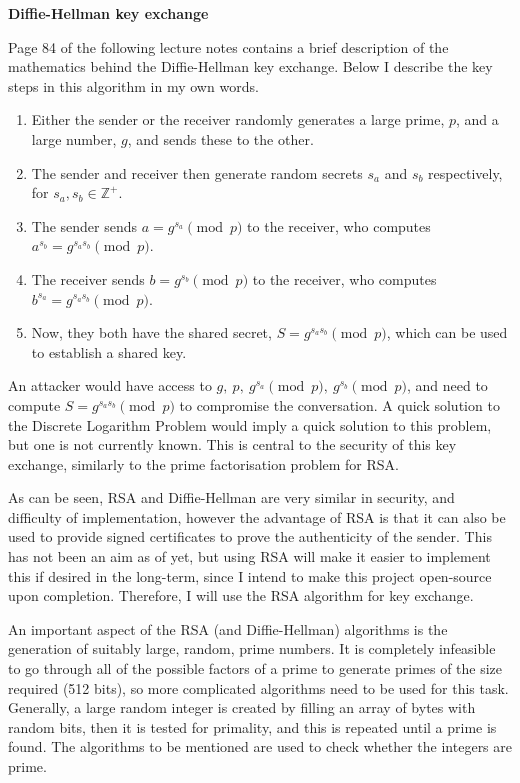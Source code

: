 \documentclass[../main.tex]{subfiles}
\begin{document}
\bigskip
\textbf{Diffie-Hellman key exchange}

Page 84 of the following lecture notes \cite{OxCompSecNotes} contains a brief description of the mathematics behind the Diffie-Hellman key exchange. Below I describe the key steps in this algorithm in my own words.
\begin{enumerate}
    \item Either the sender or the receiver randomly generates a large prime, $p$, and a large number, $g$, and sends these to the other. 
    \item The sender and receiver then generate random secrets $s_a$ and $s_b$ respectively, for $s_a,s_b \in \mathbb{Z}^+$. 
    \item The sender sends $a = g^{s_a}\pmod p$ to the receiver, who computes $a^{s_b} = g^{s_as_b}\pmod p$. 
    \item The receiver sends $b = g^{s_b}\pmod p$ to the receiver, who computes $b^{s_a} = g^{s_as_b}\pmod p$. 
    \item Now, they both have the shared secret, $S = g^{s_as_b}\pmod p$, which can be used to establish a shared key.
\end{enumerate}

An attacker would have access to $g,\ p,\ g^{s_a}\pmod p,\ g^{s_b}\pmod p$, and need to compute $S = g^{s_as_b}\pmod p$ to compromise the conversation. A quick solution to the Discrete Logarithm Problem would imply a quick solution to this problem, but one is not currently known. This is central to the security of this key exchange, similarly to the prime factorisation problem for RSA.

As can be seen, RSA and Diffie-Hellman are very similar in security, and difficulty of implementation, however the advantage of RSA is that it can also be used to provide signed certificates to prove the authenticity of the sender. This has not been an aim as of yet, but using RSA will make it easier to implement this if desired in the long-term, since I intend to make this project open-source upon completion. Therefore, I will use the RSA algorithm for key exchange.

An important aspect of the RSA (and Diffie-Hellman) algorithms is the generation of suitably large, random, prime numbers. It is completely infeasible to go through all of the possible factors of a prime to generate primes of the size required (512 bits), so more complicated algorithms need to be used for this task. Generally, a large random integer is created by filling an array of bytes with random bits, then it is tested for primality, and this is repeated until a prime is found. The algorithms to be mentioned are used to check whether the integers are prime.
\end{document}
